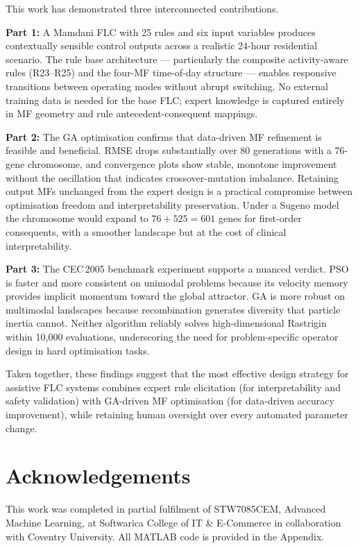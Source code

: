 \documentclass[10pt,twocolumn,a4paper]{article}
\begin{document}
This work has demonstrated three interconnected contributions.

\textbf{Part 1:} A Mamdani FLC with 25 rules and six input variables produces contextually sensible control outputs across a realistic 24-hour residential scenario. The rule base architecture --- particularly the composite activity-aware rules (R23--R25) and the four-MF time-of-day structure --- enables responsive transitions between operating modes without abrupt switching. No external training data is needed for the base FLC; expert knowledge is captured entirely in MF geometry and rule antecedent-consequent mappings.

\textbf{Part 2:} The GA optimisation confirms that data-driven MF refinement is feasible and beneficial. RMSE drops substantially over 80 generations with a 76-gene chromosome, and convergence plots show stable, monotone improvement without the oscillation that indicates crossover-mutation imbalance. Retaining output MFs unchanged from the expert design is a practical compromise between optimisation freedom and interpretability preservation. Under a Sugeno model the chromosome would expand to $76+525=601$ genes for first-order consequents, with a smoother landscape but at the cost of clinical interpretability.

\textbf{Part 3:} The CEC\,2005 benchmark experiment supports a nuanced verdict. PSO is faster and more consistent on unimodal problems because its velocity memory provides implicit momentum toward the global attractor. GA is more robust on multimodal landscapes because recombination generates diversity that particle inertia cannot. Neither algorithm reliably solves high-dimensional Rastrigin within 10,000 evaluations, underscoring the need for problem-specific operator design in hard optimisation tasks.

Taken together, these findings suggest that the most effective design strategy for assistive FLC systems combines expert rule elicitation (for interpretability and safety validation) with GA-driven MF optimisation (for data-driven accuracy improvement), while retaining human oversight over every automated parameter change.

\section*{Acknowledgements}

This work was completed in partial fulfilment of STW7085CEM, Advanced Machine Learning, at Softwarica College of IT \& E-Commerce in collaboration with Coventry University. All MATLAB code is provided in the Appendix.
\end{document}
